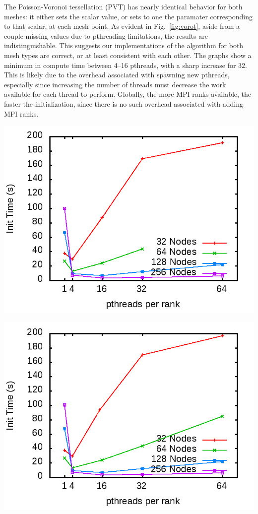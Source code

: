 \documentclass[11pt]{article}
\begin{document}
\begin{multicols*}{2}
The Poisson-Voronoi tessellation (PVT) has nearly identical behavior for both meshes:
it either sets the scalar value, or sets to one the paramater corresponding to that scalar, at each mesh point.
As evident in Fig.~\ref{fig:vorot}, aside from a couple missing values due to pthreading limitations, the results are indistinguishable.
This suggests our implementations of the algorithm for both mesh types are correct, or at least consistent with each other.
The graphs show a minimum in compute time between 4--16 pthreads, with a sharp increase for $32$.
This is likely due to the overhead associated with spawning new pthreads, especially since increasing the number of threads must decrease the work available for each thread to perform.
Globally, the more MPI ranks available, the faster the initialization, since there is no such overhead associated with adding MPI ranks.
\baselineskip
\begin{center}
\begin{minipage}{0.4\textwidth}\centering
  \includegraphics[width=\textwidth]{img/prMC-init}
  
  \includegraphics[width=\textwidth]{img/pr-init}
\end{minipage}
\end{center}
\newpage


\end{multicols*}
\end{document}
